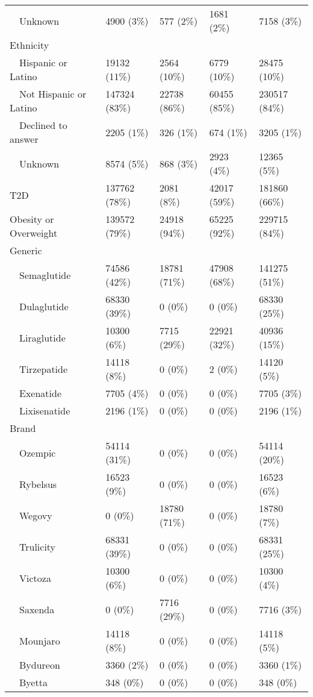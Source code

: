 \begin{longtable}{p{}p{}p{}p{}p{}}
    Unknown & 4900 (3\%) & 577 (2\%) & 1681 (2\%) & 7158 (3\%) \\ 
  Ethnicity &  &  &  &  \\ 
    Hispanic or Latino & 19132 (11\%) & 2564 (10\%) & 6779 (10\%) & 28475 (10\%) \\ 
    Not Hispanic or Latino & 147324 (83\%) & 22738 (86\%) & 60455 (85\%) & 230517 (84\%) \\ 
    Declined to answer & 2205 (1\%) & 326 (1\%) & 674 (1\%) & 3205 (1\%) \\ 
    Unknown & 8574 (5\%) & 868 (3\%) & 2923 (4\%) & 12365 (5\%) \\ 
  T2D & 137762 (78\%) & 2081 (8\%) & 42017 (59\%) & 181860 (66\%) \\ 
  Obesity or Overweight & 139572 (79\%) & 24918 (94\%) & 65225 (92\%) & 229715 (84\%) \\ 
  Generic &  &  &  &  \\ 
    Semaglutide & 74586 (42\%) & 18781 (71\%) & 47908 (68\%) & 141275 (51\%) \\ 
    Dulaglutide & 68330 (39\%) & 0 (0\%) & 0 (0\%) & 68330 (25\%) \\ 
    Liraglutide & 10300 (6\%) & 7715 (29\%) & 22921 (32\%) & 40936 (15\%) \\ 
    Tirzepatide & 14118 (8\%) & 0 (0\%) & 2 (0\%) & 14120 (5\%) \\ 
    Exenatide & 7705 (4\%) & 0 (0\%) & 0 (0\%) & 7705 (3\%) \\ 
    Lixisenatide & 2196 (1\%) & 0 (0\%) & 0 (0\%) & 2196 (1\%) \\ 
  Brand &  &  &  &  \\ 
    Ozempic & 54114 (31\%) & 0 (0\%) & 0 (0\%) & 54114 (20\%) \\ 
    Rybelsus & 16523 (9\%) & 0 (0\%) & 0 (0\%) & 16523 (6\%) \\ 
    Wegovy & 0 (0\%) & 18780 (71\%) & 0 (0\%) & 18780 (7\%) \\ 
    Trulicity & 68331 (39\%) & 0 (0\%) & 0 (0\%) & 68331 (25\%) \\ 
    Victoza & 10300 (6\%) & 0 (0\%) & 0 (0\%) & 10300 (4\%) \\ 
    Saxenda & 0 (0\%) & 7716 (29\%) & 0 (0\%) & 7716 (3\%) \\ 
    Mounjaro & 14118 (8\%) & 0 (0\%) & 0 (0\%) & 14118 (5\%) \\ 
    Bydureon & 3360 (2\%) & 0 (0\%) & 0 (0\%) & 3360 (1\%) \\ 
    Byetta & 348 (0\%) & 0 (0\%) & 0 (0\%) & 348 (0\%) \\ 

\end{longtable}
